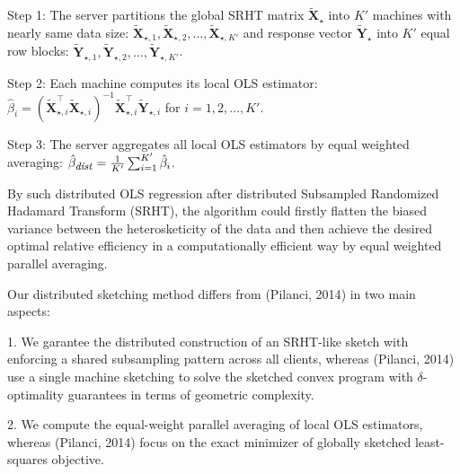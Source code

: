 \documentclass[11pt]{article}
\numberwithin{equation}{section}
\theoremstyle{plain}
\theoremstyle{definition}
\theoremstyle{remark}
\begin{document}
\begin{algorithm}[H]
\caption{Distributed Ordinary Least Squares (OLS) Regression after distributed SRHT}
\label{alg:example2}
\BlankLine
Step 1: The server partitions the global SRHT matrix $\mathbf{\tilde{X}_{\star}}$ into $K'$ machines with nearly same data size: $\mathbf{\tilde{X}}_{\star,1}, \mathbf{\tilde{X}}_{\star,2}, \ldots, \mathbf{\tilde{X}}_{\star,K'}$ and response vector $\mathbf{\tilde{Y}}_{\star}$ into $K'$ equal row blocks: $\mathbf{\tilde{Y}}_{\star,1}, \mathbf{\tilde{Y}}_{\star,2}, \ldots, \mathbf{\tilde{Y}}_{\star,K'}$.

Step 2: Each machine computes its local OLS estimator: $\hat{\beta}_i = (\mathbf{\tilde{X}}_{\star,i}^{\top}\mathbf{\tilde{X}}_{\star,i})^{-1}\mathbf{\tilde{X}}_{\star,i}^{\top}\mathbf{\tilde{Y}}_{\star,i}$ for $i = 1,2,\ldots, K'$.

Step 3: The server aggregates all local OLS estimators by equal weighted averaging: $\hat{\beta}_{\text{\footnotesize \textit{dist}}} = \frac{1}{K'}\sum_{i=1}^{K'}\hat{\beta}_i$.

\end{algorithm}



By such distributed OLS regression after distributed Subsampled Randomized Hadamard Transform (SRHT), the algorithm could firstly flatten the biased variance between the heterosketicity of the data and then achieve the desired optimal relative efficiency in a computationally efficient way by equal weighted parallel averaging.

Our distributed sketching method differs from (Pilanci, 2014\cite{pilanci2014randomizedsketchesconvexprograms}) in two main aspects:

1. We garantee the distributed construction of an SRHT-like sketch with enforcing a shared subsampling pattern across all clients, whereas (Pilanci, 2014\cite{pilanci2014randomizedsketchesconvexprograms}) use a single machine sketching to solve the sketched convex program with $\delta$-optimality guarantees in terms of geometric complexity.

2. We compute the equal-weight parallel averaging of local OLS estimators, whereas (Pilanci, 2014\cite{pilanci2014randomizedsketchesconvexprograms}) focus on the exact minimizer of globally sketched least-squares objective.
\end{document}
